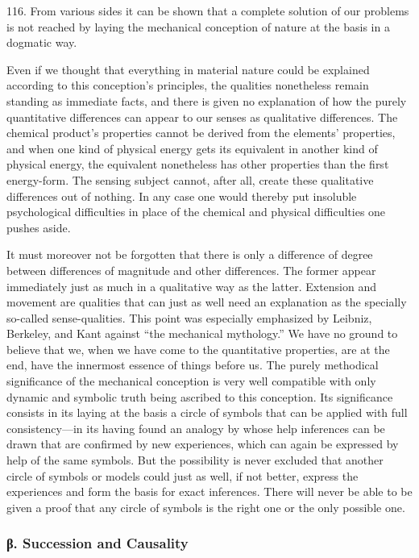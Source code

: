 \documentclass[12pt,a4paper]{book}
\newcommand{\opage}[1]{\marginnote{\footnotesize\textit{[#1]}}}
\begin{document}
116. From various sides it can be shown that a complete solution of our
problems is not reached by laying the mechanical conception of nature at the
basis in a dogmatic way.

Even if we thought that everything in material nature could be explained
according to this conception's principles, the qualities nonetheless remain
standing as immediate facts, and there is given no explanation of how the
purely quantitative differences can appear to our senses as qualitative
differences. The chemical product's properties cannot be derived from the
elements' properties, and when one kind of physical energy gets its
equivalent in another kind of physical energy, the equivalent nonetheless has
other properties than the first energy-form. The sensing subject cannot,
after all, create these qualitative differences out of nothing. In any case
one would thereby put insoluble psychological difficulties in place of the
chemical and physical difficulties one pushes aside.

It must moreover not be forgotten that there is only a difference of degree
between differences of magnitude and other differences. The former appear
immediately just as much in a qualitative way as the latter. Extension and
movement are qualities that can just as well need an explanation as the
specially so-called sense-qualities. This point was especially emphasized by Leibniz, Berkeley, and Kant against ``the mechanical
mythology.'' We have no ground to believe that we, when we have come to the
quantitative properties, are at the end, have the innermost essence of things
before us. The purely methodical significance of the mechanical conception is
very well compatible with only dynamic and symbolic truth being ascribed to
this conception. Its significance consists in its laying at the basis a circle
of symbols that can be applied with full consistency---in its having found an
analogy by \opage{278}whose help inferences can be drawn that are confirmed by new
experiences, which can again be expressed by help of the same symbols. But the
possibility is never excluded that another circle of symbols or models could
just as well, if not better, express the experiences and form the basis for
exact inferences. There will never be able to be given a proof that any circle
of symbols is the right one or the only possible one.

\subsubsection*{β. Succession and Causality}
\end{document}
